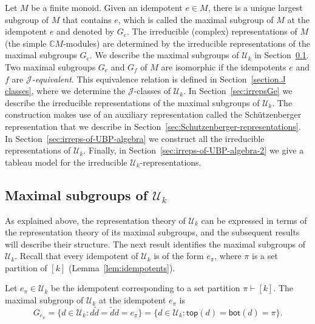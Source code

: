 \documentclass[ALCO,Unicode]{cedram}
\newcommand{\CC}{\mathbb C}
\begin{document}
Let $M$ be a finite monoid.
Given an idempotent $e \in M$, there is a unique largest subgroup of $M$ that
contains $e$, which is called the maximal subgroup of $M$ at the
idempotent $e$ and denoted by $G_e$.
The irreducible (complex) representations of $M$ (\ie the simple
$\CC{M}$-modules) are determined by the irreducible representations of the
maximal subgroups $G_e$. We describe the maximal subgroups of $\mathcal{U}_k$
in Section~\ref{sec:maximalsubgroups}.
Two maximal subgroups $G_e$ and $G_f$ of $M$ are isomorphic if the idempotents
$e$ and $f$ are \emph{$\mathscr{J}$-equivalent}.
This equivalence relation is defined in Section~\ref{section.J classes}, where
we determine the $\mathscr{J}$-classes of $\mathcal{U}_k$.
In Section~\ref{sec:irrepsGe} we describe the irreducible representations
of the maximal subgroups of $\mathcal{U}_k$.
The construction makes use of an auxiliary representation called the
Sch\"utzenberger representation that we describe in
Section~\ref{sec:Schutzenberger-representations}.
In Section~\ref{sec:irreps-of-UBP-algebra} we construct all the
irreducible representations of $\mathcal{U}_k$.
Finally, in Section~\ref{sec:irreps-of-UBP-algebra-2} we give a tableau model
for the irreducible $\mathcal{U}_k$-representations.

\subsection{Maximal subgroups of $\mathcal{U}_k$}
\label{sec:maximalsubgroups}

As explained above,
the representation theory of $\mathcal{U}_k$
can be expressed in terms of the representation theory of
its maximal subgroups, and the subsequent results will describe their structure.
The next result identifies the maximal subgroups of $\mathcal{U}_k$.
Recall that every idempotent of $\mathcal{U}_k$ is of the form
$e_\pi$, where $\pi$ is a set partition of $[k]$ (\cf Lemma~\ref{lem:idempotents}).

\begin{lemma}
    \label{lemma:maximal-subgroups}
    Let $e_\pi \in \mathcal{U}_k$ be the idempotent corresponding to a set partition
    $\pi \vdash [k]$.
    The maximal subgroup of $\mathcal{U}_k$ at the idempotent $e_\pi$ is
    \[
        G_{e_\pi} = \{d \in \mathcal{U}_k: d \widetilde{d} = \widetilde{d} d = e_\pi\}
                  = \{d \in \mathcal{U}_k: \mathsf{top}(d) =\mathsf{bot}(d) = \pi\}.
    \]
\end{lemma}
\end{document}
